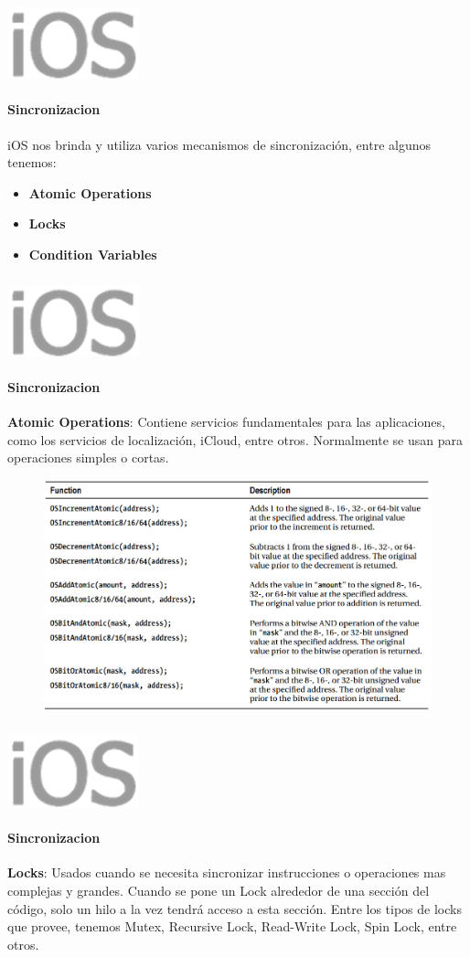 \documentclass{beamer}
\newcommand*{\ioslogo}{\includegraphics[scale=0.25]{img/logo2.png} \ }%
\begin{document}
\begin{frame}
	\frametitle{\ioslogo}
	\framesubtitle{Sincronizacion}
	
		iOS nos brinda y utiliza varios mecanismos de sincronización, entre algunos tenemos:
	\begin{itemize}
		\item \textbf{Atomic Operations}
		\item \textbf{Locks}
		\item \textbf{Condition Variables}
	\end{itemize}
\end{frame}

\begin{frame}
	\frametitle{\ioslogo}
	\framesubtitle{Sincronizacion}
	
	\textbf{Atomic Operations}: Contiene servicios fundamentales para las aplicaciones, como los servicios de localización, iCloud, entre otros. Normalmente se usan para operaciones simples o cortas.
	
	\begin{figure}[h]
		\centering
		\includegraphics[scale=0.35]{img/operaciones_atomicas.png}
	\end{figure}
\end{frame}

\begin{frame}
	\frametitle{\ioslogo}
	\framesubtitle{Sincronizacion}
	
	\textbf{Locks}: Usados cuando se necesita sincronizar instrucciones o operaciones mas complejas y grandes. Cuando se pone un Lock alrededor de una sección del código, solo un hilo a la vez tendrá acceso a esta sección. Entre los tipos de locks que provee, tenemos Mutex, Recursive Lock, Read-Write Lock, Spin Lock, entre otros.
\end{frame}
\end{document}
